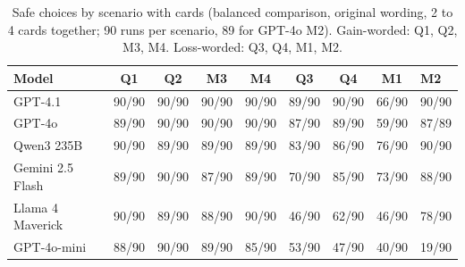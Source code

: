 \documentclass[11pt]{article}
\begin{document}
\begin{table}[ht]
\centering
\footnotesize
\caption{Safe choices by scenario with cards (balanced comparison, original wording, 2 to 4 cards together; 90 runs per scenario, 89 for GPT-4o M2). Gain-worded: Q1, Q2, M3, M4. Loss-worded: Q3, Q4, M1, M2.}
\label{tab:s5}
\setlength{\tabcolsep}{4pt}
\begin{tabular}{lcccccccl}
\toprule
Model & Q1 & Q2 & M3 & M4 & Q3 & Q4 & M1 & M2 \\
\midrule
GPT-4.1 & 90/90 & 90/90 & 90/90 & 90/90 & 89/90 & 90/90 & 66/90 & 90/90 \\
GPT-4o & 89/90 & 90/90 & 90/90 & 90/90 & 87/90 & 89/90 & 59/90 & 87/89 \\
Qwen3 235B & 90/90 & 89/90 & 89/90 & 89/90 & 83/90 & 86/90 & 76/90 & 90/90 \\
Gemini 2.5 Flash & 89/90 & 90/90 & 87/90 & 89/90 & 70/90 & 85/90 & 73/90 & 88/90 \\
Llama 4 Maverick & 90/90 & 89/90 & 88/90 & 90/90 & 46/90 & 62/90 & 46/90 & 78/90 \\
GPT-4o-mini & 88/90 & 90/90 & 89/90 & 85/90 & 53/90 & 47/90 & 40/90 & 19/90 \\
\bottomrule
\end{tabular}
\end{table}
\end{document}
